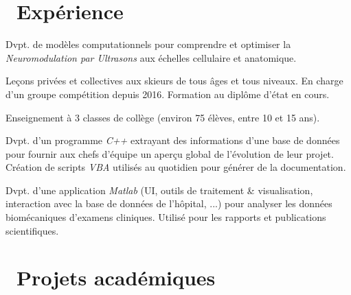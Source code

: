 \documentclass[a4paper]{cv}
\begin{document}
\begin{minipage}[t]{0.6\textwidth}

\section{\texorpdfstring{\faBriefcase}\ \ Expérience}\sectionline

Dvpt. de modèles computationnels pour comprendre et optimiser la \emph{Neuromodulation par Ultrasons} aux échelles cellulaire et anatomique. 
\sectionspace

Leçons privées et collectives aux skieurs de tous âges et tous niveaux. En charge d'un groupe compétition depuis 2016. Formation au diplôme d’état en cours.
\sectionspace

Enseignement à 3 classes de collège (environ 75 élèves, entre 10 et 15 ans).
\sectionspace

Dvpt. d'un programme \emph{C++} extrayant des informations d'une base de données pour fournir aux chefs d’équipe un aperçu global de l'évolution de leur projet. Création de scripts \emph{VBA} utilisés au quotidien pour générer de la documentation.\sectionspace

Dvpt. d'une application \emph{Matlab} (UI, outils de traitement \& visualisation, interaction avec la base de données de l'hôpital, ...) pour analyser les données biomécaniques d’examens cliniques. Utilisé pour les rapports et publications scientifiques.
\sectionspace

\section{\texorpdfstring{\faLineChart} \ \ Projets académiques}\sectionline


\end{minipage}
\end{document}
